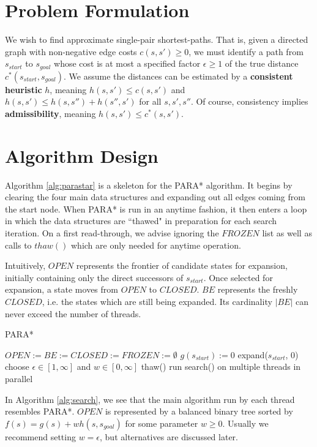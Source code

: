 \documentclass[letterpaper]{article}
\begin{document}
\section{Problem Formulation}

We wish to find approximate single-pair shortest-paths. That is, given a directed graph with non-negative edge costs $c(s,s') \ge 0$, we must identify a path from $s_{start}$ to $s_{goal}$ whose cost is at most a specified factor $\epsilon\ge 1$ of the true distance $c^*(s_{start},s_{goal})$. We assume the distances can be estimated by a \textbf{consistent heuristic} $h$, meaning $h(s,s')\le c(s,s')$ and $h(s,s')\le h(s,s'') + h(s'',s')$ for all $s,s',s''$. Of course, consistency implies \textbf{admissibility}, meaning $h(s,s')\le c^*(s,s')$.

\section{Algorithm Design}

Algorithm \ref{alg:parastar} is a skeleton for the PARA* algorithm. It begins by clearing the four main data structures and expanding out all edges coming from the start node. When PARA* is run in an anytime fashion, it then enters a loop in which the data structures are ``thawed" in preparation for each search iteration. On a first read-through, we advise ignoring the $FROZEN$ list as well as calls to $thaw()$ which are only needed for anytime operation.

Intuitively, $OPEN$ represents the frontier of candidate states for expansion, initially containing only the direct successors of $s_{start}$. Once selected for expansion, a state moves from $OPEN$ to $CLOSED$. $BE$ represents the freshly $CLOSED$, i.e. the states which are still being expanded. Its cardinality $|BE|$ can never exceed the number of threads.

\begin{algorithm}
\caption{PARA*}
\label{alg:parastar}
\begin{algorithmic}
\STATE $OPEN := BE := CLOSED := FROZEN := \emptyset$
\STATE $g(s_{start}) := 0$
\STATE expand($s_{start}$, $0$)
\REPEAT
\STATE choose $\epsilon \in [1,\infty]$ and $w \in [0,\infty]$
\STATE thaw()
\STATE run search() on multiple threads in parallel
\end{algorithmic}
\end{algorithm}

In Algorithm \ref{alg:search}, we see that the main algorithm run by each thread resembles PARA*. $OPEN$ is represented by a balanced binary tree sorted by $f(s) = g(s) + wh(s,s_{goal})$ for some parameter $w\ge 0$. Usually we recommend setting $w=\epsilon$, but alternatives are discussed later.
\end{document}
